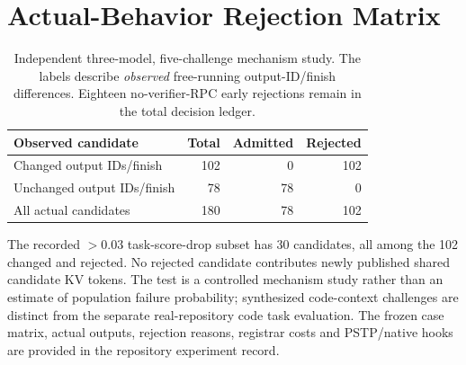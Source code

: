 \section{Actual-Behavior Rejection Matrix}
\label{sec:s-mechanism}
\begin{table}[!htb]
\centering\small
\caption{Independent three-model, five-challenge mechanism study. The labels describe \emph{observed} free-running output-ID/finish differences. Eighteen no-verifier-RPC early rejections remain in the total decision ledger.}
\label{tab:s-mechanism}
\begin{tabular}{@{}lrrr@{}}
\toprule
Observed candidate & Total & Admitted & Rejected\\
\midrule
Changed output IDs/finish & 102 & 0 & 102\\
Unchanged output IDs/finish & 78 & 78 & 0\\
\midrule
All actual candidates & 180 & 78 & 102\\
\bottomrule
\end{tabular}
\end{table}

The recorded $>0.03$ task-score-drop subset has 30 candidates, all among the 102 changed and rejected. No rejected candidate contributes newly published shared candidate KV tokens. The test is a controlled mechanism study rather than an estimate of population failure probability; synthesized code-context challenges are distinct from the separate real-repository code task evaluation. The frozen case matrix, actual outputs, rejection reasons, registrar costs and PSTP/native hooks are provided in the repository experiment record.
